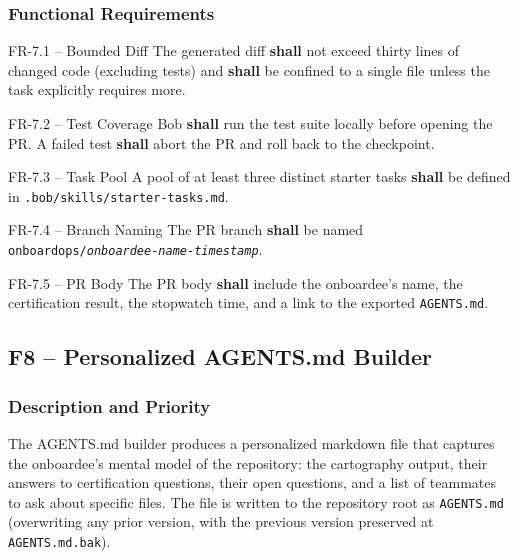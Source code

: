 \documentclass[11pt,letterpaper]{article}
\newcommand{\shall}{\textbf{shall}}
\begin{document}
\subsubsection{Functional Requirements}

\begin{reqbox}{FR-7.1 -- Bounded Diff}
The generated diff \shall{} not exceed thirty lines of changed code (excluding tests) and \shall{} be confined to a single file unless the task explicitly requires more.
\end{reqbox}

\begin{reqbox}{FR-7.2 -- Test Coverage}
Bob \shall{} run the test suite locally before opening the PR. A failed test \shall{} abort the PR and roll back to the checkpoint.
\end{reqbox}

\begin{reqbox}{FR-7.3 -- Task Pool}
A pool of at least three distinct starter tasks \shall{} be defined in \texttt{.bob/skills/starter-tasks.md}.
\end{reqbox}

\begin{reqbox}{FR-7.4 -- Branch Naming}
The PR branch \shall{} be named \texttt{onboardops/\textit{onboardee-name}-\textit{timestamp}}.
\end{reqbox}

\begin{reqbox}{FR-7.5 -- PR Body}
The PR body \shall{} include the onboardee's name, the certification result, the stopwatch time, and a link to the exported \texttt{AGENTS.md}.
\end{reqbox}

\subsection{F8 -- Personalized AGENTS.md Builder}

\subsubsection{Description and Priority}

The AGENTS.md builder produces a personalized markdown file that captures the onboardee's mental model of the repository: the cartography output, their answers to certification questions, their open questions, and a list of teammates to ask about specific files. The file is written to the repository root as \texttt{AGENTS.md} (overwriting any prior version, with the previous version preserved at \texttt{AGENTS.md.bak}).
\end{document}
